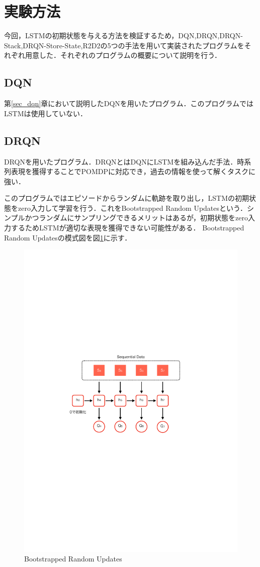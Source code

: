 \documentclass{eithesis}
\begin{document}
  \section{実験方法}\label{sec_program}
    今回，LSTMの初期状態を与える方法を検証するため，DQN,DRQN,DRQN-Stack,DRQN-Store-State,R2D2の5つの手法を用いて実装されたプログラムをそれぞれ用意した．それぞれのプログラムの概要について説明を行う．
    \subsection{DQN}
      第\ref{sec_dqn}章において説明したDQNを用いたプログラム．このプログラムではLSTMは使用していない．
    \subsection{DRQN}
      DRQNを用いたプログラム．DRQNとはDQNにLSTMを組み込んだ手法．時系列表現を獲得することでPOMDPに対応でき，過去の情報を使って解くタスクに強い．

      このプログラムではエピソードからランダムに軌跡を取り出し，LSTMの初期状態をzero入力して学習を行う．これをBootstrapped Random Updatesという．シンプルかつランダムにサンプリングできるメリットはあるが，初期状態をzero入力するためLSTMが適切な表現を獲得できない可能性がある．
      Bootstrapped Random Updatesの模式図を図\ref{fig_random}に示す．
      \begin{figure}[htbp]
        \centering
        \includegraphics[width=12cm]{./images/random.pdf}
        \caption{Bootstrapped Random Updates}
        \label{fig_random}
      \end{figure}
\end{document}
